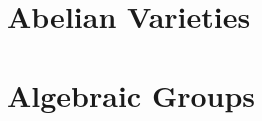 \documentclass[sectionlevel=book]{noteformyself}
\begin{document}
    \chapter{Abelian Varieties}
        
        

    \chapter{Algebraic Groups}
        
        
        
        



    \printbibliography[heading=bibintoc, title={References}]
    
\end{document}
